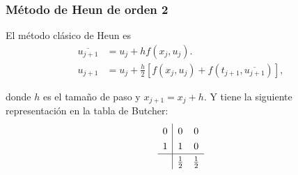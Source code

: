 \begin{frame}
  \frametitle{Método de Heun de orden 2}
  El método clásico de Heun es
  \begin{align*}
    \overline{u_{j+1}} & =
    u_{j}+
    hf\left(x_{j},u_{j}\right). \\
    u_{j+1}            & =
    u_{j}+
    \frac{h}{2}
    \left[
      f\left(x_{j},u_{j}\right)+
      f\left(t_{j+1},\overline{u_{j+1}}\right)
      \right],
  \end{align*}

  donde $h$ es el tamaño de paso y $x_{j+1}=x_{j}+h$.
  Y tiene la siguiente representación en la tabla de Butcher:
  \begin{equation*}
    \renewcommand\arraystretch{1.3}
    \begin{array}
      {c|cc}
      0 & 0           & 0           \\
      1 & 1           & 0           \\
      \hline
        & \frac{1}{2} & \frac{1}{2}
    \end{array}
  \end{equation*}
\end{frame}